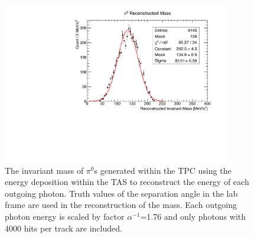 \begin{figure}[htbp]
\begin{center}
  	\includegraphics[width=100mm]{Chapter4/figures/piZeroReconMassScaled_4000HitCut_0o05GeVcut.pdf}
		\caption{The invariant mass of $\pi^{0}$s generated within the TPC using the energy deposition within the TAS to reconstruct the energy of each outgoing photon. Truth values of the separation angle in the lab frame are used in the reconstruction of the mass. Each outgoing photon energy is scaled by factor $\alpha^{-1}$=1.76 and only photons with 4000 hits per track are included.}
	\label{fig:piZeroReconMassWithCuts}
\end{center}
\end{figure}


